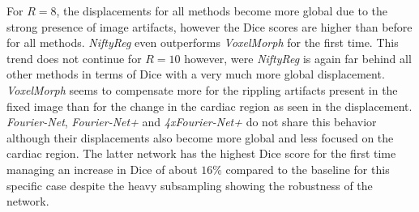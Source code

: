 For $R=8$, the displacements for all methods become more global due to the strong presence of image artifacts, however the Dice scores are higher than before for all methods. \emph{NiftyReg} even outperforms \emph{VoxelMorph} for the first time. This trend does not continue for $R=10$ however, were \emph{NiftyReg} is again far behind all other methods in terms of Dice with a very much more global displacement. \emph{VoxelMorph} seems to compensate more for the rippling artifacts present in the fixed image than for the change in the cardiac region as seen in the displacement. \emph{Fourier-Net}, \emph{Fourier-Net+} and \emph{4xFourier-Net+} do not share this behavior although their displacements also become more global and less focused on the cardiac region. The latter network has the highest Dice score for the first time managing an increase in Dice of about $16\%$ compared to the baseline for this specific case despite the heavy subsampling showing the robustness of the network.

